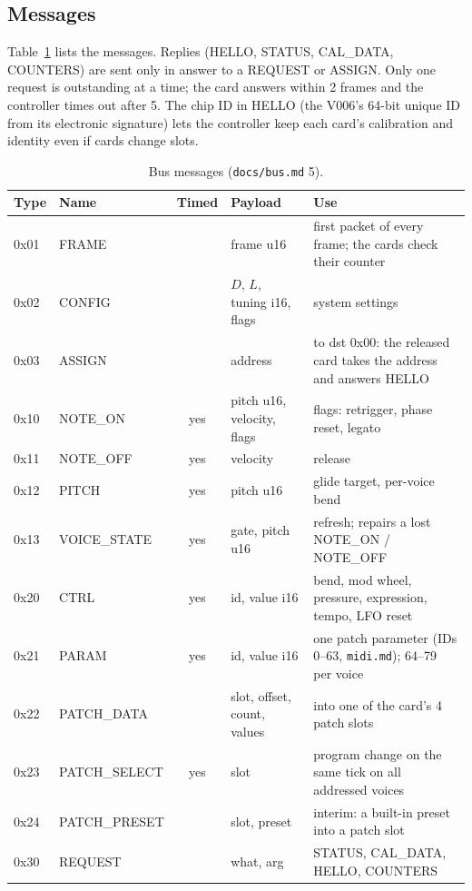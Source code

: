 \documentclass[11pt,a4paper]{article}
\newcommand{\file}[1]{\texttt{#1}}
\begin{document}
\subsection{Messages}
Table~\ref{tab:msgs} lists the messages. Replies (HELLO, STATUS, CAL\_DATA, COUNTERS) are sent only in answer to a
REQUEST or ASSIGN. Only one request is outstanding at a time; the card answers within 2 frames and the controller
times out after 5. The chip ID in HELLO (the V006's 64-bit unique ID from its electronic signature) lets the controller
keep each card's calibration and identity even if cards change slots.

\begin{table}[htbp]
\centering\small
\caption{Bus messages (\file{docs/bus.md} 5).}\label{tab:msgs}
\begin{tabularx}{\textwidth}{@{}l l c >{\raggedright}p{4.2cm} >{\raggedright\arraybackslash}X@{}}
\toprule
Type & Name & Timed & Payload & Use \\
\midrule
0x01 & FRAME & & frame u16 & first packet of every frame; the cards check their counter \\
0x02 & CONFIG & & $D$, $L$, tuning i16, flags & system settings \\
0x03 & ASSIGN & & address & to dst 0x00: the released card takes the address and answers HELLO \\
0x10 & NOTE\_ON & yes & pitch u16, velocity, flags & flags: retrigger, phase reset, legato \\
0x11 & NOTE\_OFF & yes & velocity & release \\
0x12 & PITCH & yes & pitch u16 & glide target, per-voice bend \\
0x13 & VOICE\_STATE & yes & gate, pitch u16 & refresh; repairs a lost NOTE\_ON / NOTE\_OFF \\
0x20 & CTRL & yes & id, value i16 & bend, mod wheel, pressure, expression, tempo, LFO reset \\
0x21 & PARAM & yes & id, value i16 & one patch parameter (IDs 0--63, \file{midi.md}); 64--79 per voice \\
0x22 & PATCH\_DATA & & slot, offset, count, values & into one of the card's 4 patch slots \\
0x23 & PATCH\_SELECT & yes & slot & program change on the same tick on all addressed voices \\
0x24 & PATCH\_PRESET & & slot, preset & interim: a built-in preset into a patch slot \\
0x30 & REQUEST & & what, arg & STATUS, CAL\_DATA, HELLO, COUNTERS \\

\end{tabularx}
\end{table}
\end{document}
